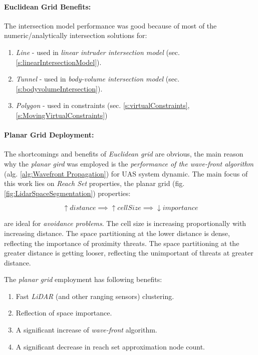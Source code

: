 \paragraph{Euclidean Grid Benefits:} The intersection model performance was good because of most of the numeric/analytically intersection solutions for:
\begin{enumerate}
    \item \emph{Line} - used in \emph{linear intruder intersection model} (sec. \ref{s:linearIntersectionModel}).
    
    \item \emph{Tunnel} - used in \emph{body-volume intersection model} (sec. \ref{s:bodyvolumeIntersection}).
    
    \item \emph{Polygon} - used in constraints (sec. \ref{s:virtualConstraints}, \ref{s:MovingVirtualConstraints})
\end{enumerate}

\paragraph{Planar Grid Deployment:} The shortcomings and benefits of \emph{Euclidean grid} are obvious, the main reason why the \emph{planar gird} was employed is the \emph{performance of the wave-front algorithm} (alg. \ref{alg:Wavefront Propagation}) for UAS system dynamic. The main focus of this work lies on \emph{Reach Set} properties, the planar grid (fig. \ref{fig:LidarSpaceSegmentation}) properties:

\begin{equation*}
    \uparrow distance \implies \uparrow cell Size \implies \downarrow importance
\end{equation*}

\noindent are ideal for \emph{avoidance problems}. The cell size is increasing proportionally with increasing distance. The space partitioning at the lower distance is dense, reflecting the importance of proximity threats. The space partitioning at the greater distance is getting looser, reflecting the unimportant of threats at greater distance. 

\noindent The \emph{planar grid} employment has following benefits:
\begin{enumerate}
    \item Fast \emph{LiDAR} (and other ranging sensors) clustering.
    \item Reflection of space importance.
    \item A significant increase of \emph{wave-front} algorithm.
    \item A significant decrease in reach set approximation node count.
\end{enumerate}

